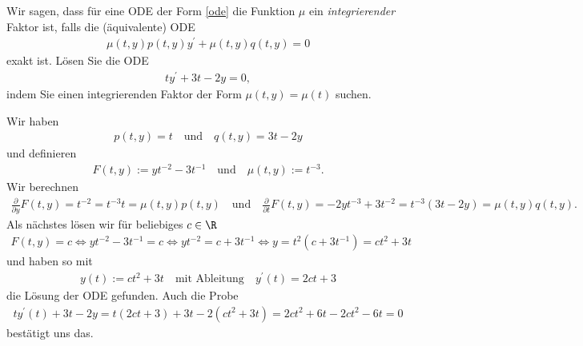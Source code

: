 \begin{exercise}
Wir sagen, dass für eine ODE der Form \eqref{ode} die Funktion $\mu$ ein
\textit{integrierender} Faktor ist, falls die (äquivalente) ODE
\begin{align*}
  \mu(t,y)p(t,y)y^{\prime} + \mu(t,y)q(t,y) = 0
\end{align*}
exakt ist. Lösen Sie die ODE
\begin{align*}
  ty^{\prime} + 3t - 2y = 0,
\end{align*}
indem Sie einen integrierenden Faktor der Form $\mu(t,y) = \mu(t)$ suchen. \\
\end{exercise}
\begin{solution}
  Wir haben
  \begin{align*}
    p(t, y) = t \quad \textrm{und} \quad q(t,y) = 3t - 2y
  \end{align*}
  und definieren
  \begin{align*}
    F(t, y) := yt^{-2} - 3t^{-1} \quad \textrm{und} \quad \mu(t,y) := t^{-3}.
  \end{align*}
  Wir berechnen
  \begin{align*}
    \frac{\partial}{\partial y} F(t, y) = t^{-2} = t^{-3}t = \mu(t, y) p(t, y) \quad \textrm{und} \quad \frac{\partial}{\partial t} F(t, y) = -2yt^{-3} + 3t^{-2} = t^{-3}(3t - 2y) = \mu(t, y) q(t, y).
  \end{align*}
  Als nächstes lösen wir für beliebiges $c \in \R$
  \begin{align*}
    F(t, y) = c \Leftrightarrow yt^{-2} - 3t^{-1} = c \Leftrightarrow yt^{-2} = c + 3t^{-1} \Leftrightarrow y = t^2 (c + 3t^{-1}) = ct^2 + 3t
  \end{align*}
  und haben so mit
  \begin{align*}
    y(t) := ct^2 + 3t \quad \textrm{mit Ableitung} \quad y^\prime(t) = 2ct + 3
  \end{align*}
  die Lösung der ODE gefunden. Auch die Probe
  \begin{align*}
    ty^\prime(t) + 3t - 2y = t (2ct + 3) + 3t - 2(ct^2 + 3t) = 2ct^2 + 6t - 2ct^2 -6t = 0
  \end{align*}
  bestätigt uns das.
\end{solution}
